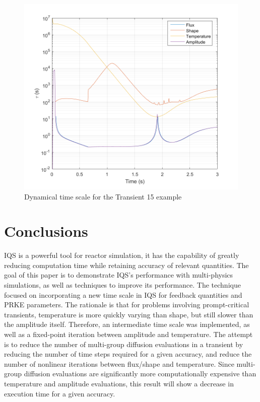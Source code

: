 \documentclass{anstrans}
\begin{document}
\begin{figure}[htbp!]
\centering
\includegraphics[width=\linewidth]{time_constant_tran15.png}
\caption{Dynamical time scale for the Transient 15 example}
\label{fig:tran15tc}
\end{figure}


\section{Conclusions}

IQS is a powerful tool for reactor simulation, it has the capability of greatly reducing computation time while retaining accuracy of relevant quantities.  The goal of this paper is to demonstrate IQS's performance with multi-physics simulations, as well as techniques to improve its performance.  The technique focused on incorporating a new time scale in IQS for feedback quantities and PRKE parameters. The rationale is that for problems involving prompt-critical transients, temperature is more quickly varying than shape, but still slower than the amplitude itself.  Therefore, an intermediate time scale was implemented, as well as a fixed-point iteration between amplitude and temperature.  The attempt is to reduce the number of multi-group diffusion evaluations in a transient by reducing the number of time steps required for a given accuracy, and reduce the number of nonlinear iterations between flux/shape and temperature.  Since multi-group diffusion evaluations are significantly more computationally expensive than temperature and amplitude evaluations, this result will show a decrease in execution time for a given accuracy.
\end{document}
